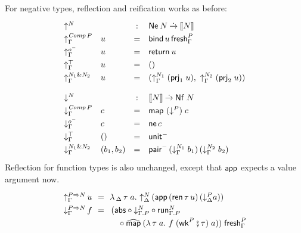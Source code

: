 \documentclass[sigconf,screen,fleqn]{acmart} %
\begin{document}
For negative types, reflection and reification works as before:
\[
\renewcommand{\left}{}
\renewcommand{\right}{}
\def\arraystretch{1.3}
\begin{array}{llcl} %
  \multicolumn 2 l {\up N} & : & \tNe\,N \todot \den N \\
  \upG {\Comp P} & u & = & \tbind\,u\,\tfresh^P_\Gamma \\
  \upG \natom    & u & = & \treturn\,u \\
  \upG \top      & u & = & \ttempty \\
  \upG {N_1 \ntimes N_2} & u & = & \left(
    \upG {N_1} \; (\prj 1 u)
    ,\
    \upG {N_2} \; (\prj 2 u)
    \right)
\\[2ex]
  \multicolumn 2 l {\down N} & : & \den N \todot \tNf\;N \\
  \downG {\Comp P} & c  & = & \tmap\;(\down P)\;c \\
  \downG \natom    & c  & = & \tne\,c \\
  \downG \top      & () & = & \nunit \\
  \downG {N_1 \ntimes N_2} & (b_1,b_2) & = & \npair
    \, (\downG {N_1} \; b_1)
    \, (\downG {N_2} \; b_2)
    \\
\end{array}
\]
Reflection for function types is also unchanged, except that $\mathsf{app}$
expects a value argument now.
\[
\def\arraystretch{1.3}
\renewcommand{\left}{\,}
\renewcommand{\right}{}
\begin{array}{l@{\,}l@{~~}c@{~~}l}
  \upG {P \To N} & u & = & \lambda
    \, _\Delta
    \, \tau \; a
    . \
    \up[\Delta] N \left( \tapp\,(\tren\,\tau\,u)\,(\down[\Delta] P a) \right)
    \\
  \downG {P \To N} & f & = &
    \left( \tabs
     \comp \down[\cext \Gamma P] N
     \comp \trun^N_{\cext \Gamma P}
\\ &&& \quad {}
     \comp \stmap
      \left(
        \lambda
          \, \tau
          \; a
          . \
          f\; (\twk^P \rcomp \tau)\; a
        \right)
    \right)
    \;\tfresh^P_\Gamma
    \\
\end{array}
\]
\end{document}
